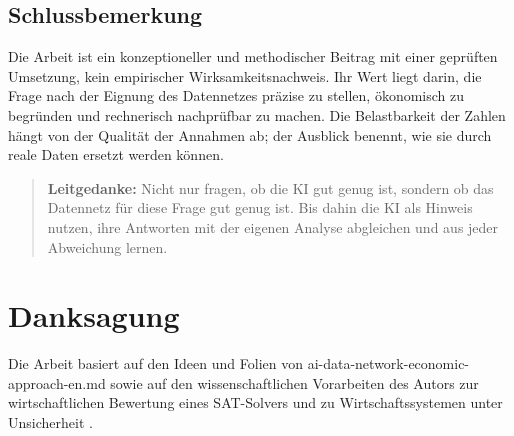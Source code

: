 \documentclass[a4paper,12pt,twoside]{report}
\theoremstyle{definition}
\begin{document}
\section{Schlussbemerkung}
Die Arbeit ist ein konzeptioneller und methodischer Beitrag mit einer geprüften Umsetzung, kein empirischer Wirksamkeitsnachweis. Ihr Wert liegt darin, die Frage nach der Eignung des Datennetzes präzise zu stellen, ökonomisch zu begründen und rechnerisch nachprüfbar zu machen. Die Belastbarkeit der Zahlen hängt von der Qualität der Annahmen ab; der Ausblick benennt, wie sie durch reale Daten ersetzt werden können.

\begin{quote}
\textbf{Leitgedanke:} Nicht nur fragen, ob die KI gut genug ist, sondern ob das Datennetz für diese Frage gut genug ist. Bis dahin die KI als Hinweis nutzen, ihre Antworten mit der eigenen Analyse abgleichen und aus jeder Abweichung lernen.
\end{quote}

\chapter*{Danksagung}
Die Arbeit basiert auf den Ideen und Folien von ai-data-network-economic-approach-en.md sowie auf den wissenschaftlichen Vorarbeiten des Autors zur wirtschaftlichen Bewertung eines SAT-Solvers und zu Wirtschaftssystemen unter Unsicherheit \cite{sat2026,uncertainty2026}.

\appendix
\end{document}
